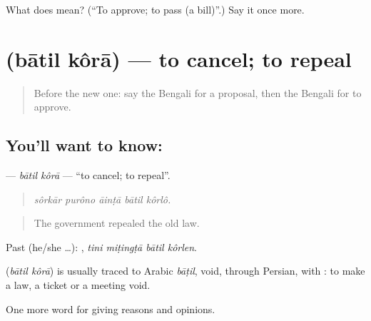 \begin{tcolorbox}[breakable,colback=teal!4,colframe=teal!35!black,title={Before you move on}]
What does   mean? (\textquotedblleft{}To approve; to pass (a bill)\textquotedblright{}.) Say it once more.
\end{tcolorbox}
\section[\texorpdfstring{\bn{বাতিল} \bn{করা} (bātil kôrā)}{বাতিল করা (bātil kôrā)}]{  (bātil kôrā) — to cancel; to repeal}

\label{lesson:BN-C345-batil-kora}



\begin{quote}
Before the new one: say the Bengali for a proposal, then the Bengali for to approve.
\end{quote}

\subsection*{You'll want to know:  }
\textbf{ } — \emph{bātil kôrā} — \textquotedblleft{}to cancel; to repeal\textquotedblright{}.

\begin{quote}
    
\end{quote}

\begin{quote}
\emph{sôrkār purôno āinṭā bātil kôrlô.}
\end{quote}

\begin{quote}
The government repealed the old law.
\end{quote}

Past (he/she …):    , \emph{tini miṭingṭā bātil kôrlen}.

\begin{cousinweb}
\textbf{ } (\emph{bātil kôrā}) is usually traced to Arabic \emph{bāṭil}, void, through Persian, with : to make a law, a ticket or a meeting void.
\end{cousinweb}

\begin{grammarlens}[title={What you've built}]
One more word for giving reasons and opinions.
\end{grammarlens}

